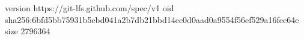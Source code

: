 version https://git-lfs.github.com/spec/v1
oid sha256:6bfd5bb75931b5ebd041a2b7db21bbd14ec0d0aad0a9554f56ef529a16fee64e
size 2796364
